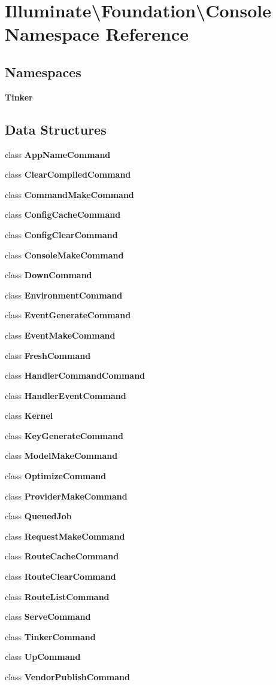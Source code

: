 \section{Illuminate\textbackslash{}Foundation\textbackslash{}Console Namespace Reference}
\label{namespace_illuminate_1_1_foundation_1_1_console}
\subsection*{Namespaces}
\begin{DoxyCompactItemize}
\item 
 {\bf Tinker}
\end{DoxyCompactItemize}
\subsection*{Data Structures}
\begin{DoxyCompactItemize}
\item 
class {\bf App\+Name\+Command}
\item 
class {\bf Clear\+Compiled\+Command}
\item 
class {\bf Command\+Make\+Command}
\item 
class {\bf Config\+Cache\+Command}
\item 
class {\bf Config\+Clear\+Command}
\item 
class {\bf Console\+Make\+Command}
\item 
class {\bf Down\+Command}
\item 
class {\bf Environment\+Command}
\item 
class {\bf Event\+Generate\+Command}
\item 
class {\bf Event\+Make\+Command}
\item 
class {\bf Fresh\+Command}
\item 
class {\bf Handler\+Command\+Command}
\item 
class {\bf Handler\+Event\+Command}
\item 
class {\bf Kernel}
\item 
class {\bf Key\+Generate\+Command}
\item 
class {\bf Model\+Make\+Command}
\item 
class {\bf Optimize\+Command}
\item 
class {\bf Provider\+Make\+Command}
\item 
class {\bf Queued\+Job}
\item 
class {\bf Request\+Make\+Command}
\item 
class {\bf Route\+Cache\+Command}
\item 
class {\bf Route\+Clear\+Command}
\item 
class {\bf Route\+List\+Command}
\item 
class {\bf Serve\+Command}
\item 
class {\bf Tinker\+Command}
\item 
class {\bf Up\+Command}
\item 
class {\bf Vendor\+Publish\+Command}
\end{DoxyCompactItemize}
